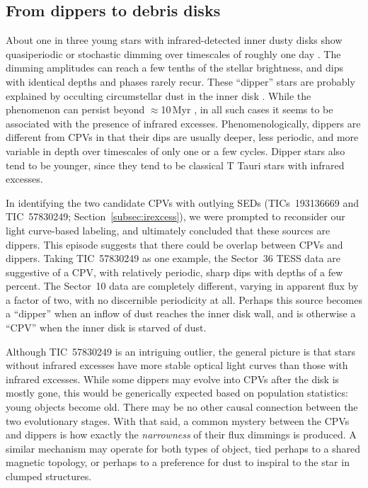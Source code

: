 \documentclass[11pt,twocolumn,tighten]{aastex63}
\begin{document}
\subsection{From dippers to debris disks}
\label{subsec:discdippers}

About one in three young stars with infrared-detected inner dusty
disks show quasiperiodic or stochastic dimming over timescales of
roughly one day
\citep[e.g.][]{2010A&A...519A..88A,2010ApJS..191..389C}.  The dimming
amplitudes can reach a few tenths of the stellar brightness, and dips
with identical depths and phases rarely recur.  These ``dipper'' stars
are probably explained by occulting circumstellar dust in the inner
disk
\citep[e.g.][]{2014AJ....147...82C,2016ApJ...816...69A,2021ApJ...908...16R,2022ApJS..263...14C}.
While the phenomenon can persist beyond $\approx$10\,Myr
\citep{2019MNRAS.488.4465G,2022MNRAS.514.1386G}, in all such cases it
seems to be associated with the presence of infrared excesses.
Phenomenologically, dippers are different from CPVs in that their dips
are usually deeper, less periodic, and more variable in depth over
timescales of only one or a few cycles.  Dipper stars also tend to be
younger, since they tend to be classical T Tauri stars with infrared
excesses.

In identifying the two candidate CPVs with outlying SEDs
(TICs~193136669 and TIC~57830249; Section~\ref{subsec:irexcess}), we
were prompted to reconsider our light curve-based labeling, and
ultimately concluded that these sources are dippers.  This episode
suggests that there could be overlap between CPVs and dippers.  Taking
TIC~57830249 as one example, the Sector~36 TESS data are suggestive of
a CPV, with relatively periodic, sharp dips with depths of a few
percent.  The Sector~10 data are completely different, varying in
apparent flux by a factor of two, with no discernible periodicity at
all.  Perhaps this source becomes a ``dipper'' when an inflow of dust
reaches the inner disk wall, and is otherwise a ``CPV'' when the inner
disk is starved of dust.

Although TIC~57830249 is an intriguing outlier, the general picture is
that stars without infrared excesses have more stable optical light
curves than those with infrared excesses.  While some dippers may
evolve into CPVs after the disk is mostly gone, this would be
generically expected based on population statistics: young objects
become old.  There may be no other causal connection between the two
evolutionary stages.  With that said, a common mystery between the
CPVs and dippers is how exactly the {\it narrowness} of their flux
dimmings is produced.  A similar mechanism may operate for both types
of object, tied perhaps to a shared magnetic topology, or perhaps to a
preference for dust to inspiral to the star in clumped structures.
\end{document}
